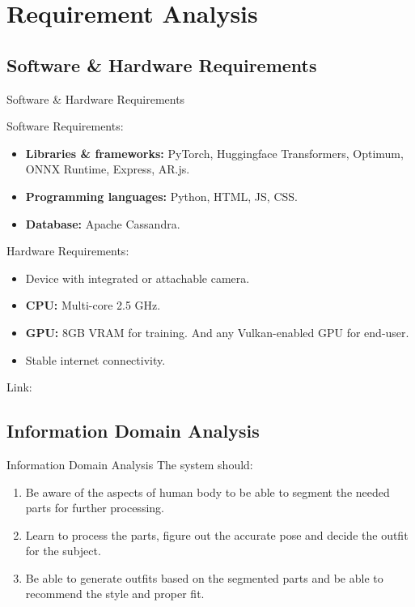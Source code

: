 \section{Requirement Analysis}

\subsection{Software \& Hardware Requirements}
\begin{frame}{Software \& Hardware Requirements}
	\begin{multicols}{2}
		Software Requirements:
		\begin{itemize}
			\item \textbf{Libraries \& frameworks:} PyTorch, Huggingface Transformers, Optimum, ONNX Runtime, Express, AR.js.
			\item \textbf{Programming languages:} Python, HTML, JS, CSS.
			\item \textbf{Database:} Apache Cassandra.
		\end{itemize}

		\break

		Hardware Requirements:
		\begin{itemize}
			\item Device with integrated or attachable camera.
			\item \textbf{CPU:} Multi-core 2.5 GHz.
			\item \textbf{GPU:} 8GB VRAM for training. And any Vulkan-enabled GPU for end-user.
			\item Stable internet connectivity.
		\end{itemize}
	\end{multicols}
	Link: \textcolor{blue}{\underline{}}
\end{frame}

\subsection{Information Domain Analysis}
\begin{frame}{Information Domain Analysis}
	The system should:
	\begin{enumerate}
		\item Be aware of the aspects of human body to be able to segment the needed parts for further processing.
		\item Learn to process the parts, figure out the accurate pose and decide the outfit for the subject.
		\item Be able to generate outfits based on the segmented parts and be able to recommend the style and proper fit.
	\end{enumerate}
\end{frame}

